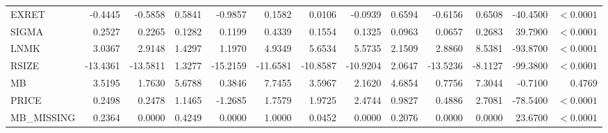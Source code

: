 \begin{landscape}
\begin{table}[p]
\begin{tabular}{lrrrrrrrrrrrr}
EXRET & -0.4445 & -0.5858 & 0.5841 & -0.9857 & 0.1582 & 0.0106 & -0.0939 & 0.6594 & -0.6156 & 0.6508 & -40.4500 & $<0.0001$ \\
SIGMA & 0.2527 & 0.2265 & 0.1282 & 0.1199 & 0.4339 & 0.1554 & 0.1325 & 0.0963 & 0.0657 & 0.2683 & 39.7900 & $<0.0001$ \\
LNMK & 3.0367 & 2.9148 & 1.4297 & 1.1970 & 4.9349 & 5.6534 & 5.5735 & 2.1509 & 2.8860 & 8.5381 & -93.8700 & $<0.0001$ \\
RSIZE & -13.4361 & -13.5811 & 1.3277 & -15.2159 & -11.6581 & -10.8587 & -10.9204 & 2.0647 & -13.5236 & -8.1127 & -99.3800 & $<0.0001$ \\
MB & 3.5195 & 1.7630 & 5.6788 & 0.3846 & 7.7455 & 3.5967 & 2.1620 & 4.6854 & 0.7756 & 7.3044 & -0.7100 & 0.4769 \\
PRICE & 0.2498 & 0.2478 & 1.1465 & -1.2685 & 1.7579 & 1.9725 & 2.4744 & 0.9827 & 0.4886 & 2.7081 & -78.5400 & $<0.0001$ \\
MB\_MISSING & 0.2364 & 0.0000 & 0.4249 & 0.0000 & 1.0000 & 0.0452 & 0.0000 & 0.2076 & 0.0000 & 0.0000 & 23.6700 & $<0.0001$ \\
\bottomrule
\end{tabular}
\end{table}
\end{landscape}
